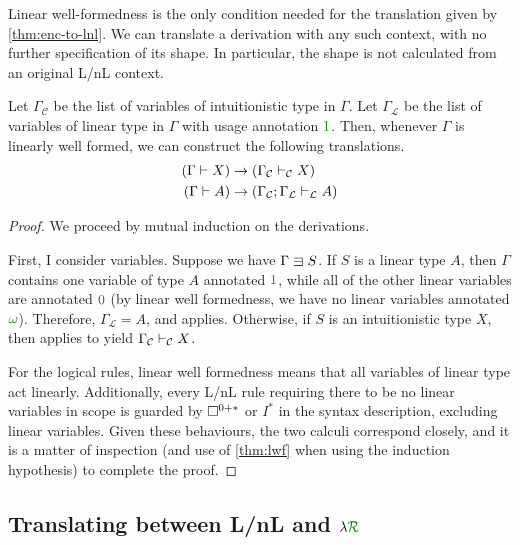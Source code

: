 Linear well-formedness is the only condition needed for the translation given by
\cref{thm:enc-to-lnl}.
We can translate a derivation with any such context, with no further
specification of its shape.
In particular, the shape is not calculated from an original L/nL context.

\begin{proposition}\label{thm:enc-to-lnl}
  Let $\Gamma_{\mathcal C}$ be the list of variables of intuitionistic type in
  $\Gamma$.
  Let $\Gamma_{\mathcal L}$ be the list of variables of linear type in $\Gamma$
  with usage annotation $\gr1$.
  Then, whenever $\Gamma$ is linearly well formed, we can construct the
  following translations.
  \begin{align}
    (\Gamma \vdash X) &\to \plr{\Gamma_{\mathcal C} \vdashC X} \\
    (\Gamma \vdash A) &\to
      \plr{\Gamma_{\mathcal C}; \Gamma_{\mathcal L} \vdashL A}
  \end{align}
\end{proposition}
\begin{proof}
  We proceed by mutual induction on the derivations.

  First, I consider variables.
  Suppose we have $\Gamma \sqni S$.
  If $S$ is a linear type $A$, then $\Gamma$ contains one variable of type $A$
  annotated $\gr1$, while all of the other linear variables are annotated $\gr0$
  (by linear well formedness, we have no linear variables annotated
  $\gr\omega$).
  Therefore, $\Gamma_{\mathcal L} = A$, and  applies.
  Otherwise, if $S$ is an intuitionistic type $X$, then
   applies to yield $\Gamma_{\mathcal C} \mathrel{\vdash_{\mathcal C}} X$.

  For the logical rules, linear well formedness means that all variables of
  linear type act linearly.
  Additionally, every L/nL rule requiring there to be no linear variables in
  scope is guarded by $\Box^{0{+}{*}}$ or $I^*$ in the syntax description, excluding
  linear variables.
  Given these behaviours, the two calculi correspond closely, and it is a matter
  of inspection (and use of \cref{thm:lwf} when using the induction hypothesis)
  to complete the proof.
\end{proof}

\subsection{Translating between L/nL and $\lambda\gr{\mathcal R}$}

